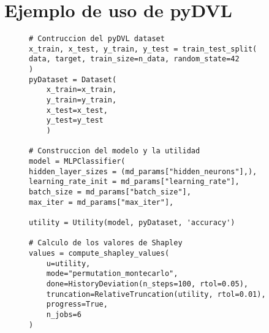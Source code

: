 \section{Ejemplo de uso de pyDVL}
\label{sec:ejemplo_pydvl}
\begin{figure}[ht!]
    \begin{lstlisting}
# Contruccion del pyDVL dataset
x_train, x_test, y_train, y_test = train_test_split(
data, target, train_size=n_data, random_state=42
)
pyDataset = Dataset(
    x_train=x_train,
    y_train=y_train,
    x_test=x_test,
    y_test=y_test
    )

# Construccion del modelo y la utilidad
model = MLPClassifier(
hidden_layer_sizes = (md_params["hidden_neurons"],),
learning_rate_init = md_params["learning_rate"],
batch_size = md_params["batch_size"],
max_iter = md_params["max_iter"],

utility = Utility(model, pyDataset, 'accuracy')

# Calculo de los valores de Shapley
values = compute_shapley_values(
    u=utility,
    mode="permutation_montecarlo",
    done=HistoryDeviation(n_steps=100, rtol=0.05),
    truncation=RelativeTruncation(utility, rtol=0.01),
    progress=True,
    n_jobs=6
)
    \end{lstlisting}
\end{figure}





